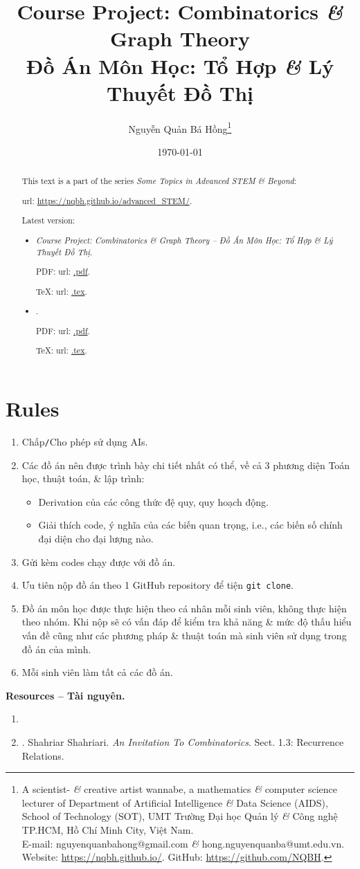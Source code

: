 \documentclass{article}
\title{Course Project: Combinatorics {\it\&} Graph Theory\\Đồ Án Môn Học: Tổ Hợp {\it\&} Lý Thuyết Đồ Thị}
\author{Nguyễn Quản Bá Hồng\footnote{A scientist- {\it\&} creative artist wannabe, a mathematics {\it\&} computer science lecturer of Department of Artificial Intelligence {\it\&} Data Science (AIDS), School of Technology (SOT), UMT Trường Đại học Quản lý {\it\&} Công nghệ TP.HCM, Hồ Chí Minh City, Việt Nam.\\E-mail: {\sf nguyenquanbahong@gmail.com} {\it\&} {\sf hong.nguyenquanba@umt.edu.vn}. Website: \url{https://nqbh.github.io/}. GitHub: \url{https://github.com/NQBH}.}}
\date{\today}
\begin{document}
\maketitle
\begin{abstract}
    This text is a part of the series {\it Some Topics in Advanced STEM \& Beyond}:
    
    {\sc url}: \url{https://nqbh.github.io/advanced_STEM/}.
    
    Latest version:
    \begin{itemize}
        \item {\it Course Project: Combinatorics \& Graph Theory -- Đồ Án Môn Học: Tổ Hợp \& Lý Thuyết Đồ Thị}.
        
        PDF: {\sc url}: \url{.pdf}.
        
        \TeX: {\sc url}: \url{.tex}.
        \item {\it }.
        
        PDF: {\sc url}: \url{.pdf}.
        
        \TeX: {\sc url}: \url{.tex}.
    \end{itemize}
\end{abstract}
\tableofcontents


\section{Rules}

\begin{enumerate}
    \item Chấp{\tt/}Cho phép sử dụng AIs.
    \item Các đồ án nên được trình bày chi tiết nhất có thể, về cả 3 phương diện Toán học, thuật toán, \& lập trình:
    \begin{itemize}
        \item Derivation của các công thức đệ quy, quy hoạch động.
        \item Giải thích code, ý nghĩa của các biến quan trọng, i.e., các biến số chính đại diện cho đại lượng nào.
    \end{itemize}
    \item Gửi kèm codes chạy được với đồ án.
    \item Ưu tiên nộp đồ án theo 1 GitHub repository để tiện {\tt git clone}.
    \item Đồ án môn học được thực hiện theo cá nhân mỗi sinh viên, không thực hiện theo nhóm. Khi nộp sẽ có vấn đáp để kiểm tra khả năng \& mức độ thấu hiểu vấn đề cũng như các phương pháp \& thuật toán mà sinh viên sử dụng trong đồ án của mình.
    \item Mỗi sinh viên làm tất cả các đồ án.
\end{enumerate}
\textbf{\textsf{Resources -- Tài nguyên.}}
\begin{enumerate}
    \item \item \cite{Shahriari2022}. {\sc Shahriar Shahriari}. {\it An Invitation To Combinatorics}. Sect. 1.3: Recurrence Relations.
\end{enumerate}
\end{document}
